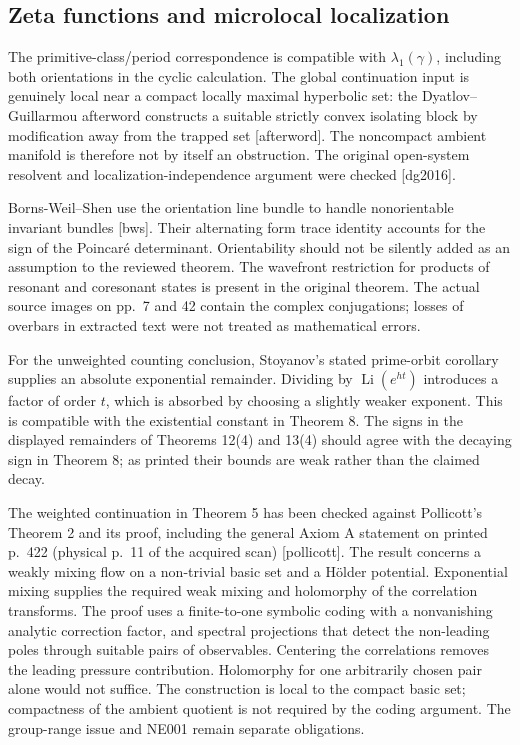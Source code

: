 \documentclass[10pt]{article}
\begin{document}
\subsection*{Zeta functions and microlocal localization}
The primitive-class/period correspondence is compatible with \(\lambda_1(\gamma)\), including both orientations in the cyclic calculation. The global continuation input is genuinely local near a compact locally maximal hyperbolic set: the Dyatlov–Guillarmou afterword constructs a suitable strictly convex isolating block by modification away from the trapped set [afterword]. The noncompact ambient manifold is therefore not by itself an obstruction. The original open-system resolvent and localization-independence argument were checked [dg2016].\par
Borns-Weil–Shen use the orientation line bundle to handle nonorientable invariant bundles [bws]. Their alternating form trace identity accounts for the sign of the Poincaré determinant. Orientability should not be silently added as an assumption to the reviewed theorem. The wavefront restriction for products of resonant and coresonant states is present in the original theorem. The actual source images on pp. 7 and 42 contain the complex conjugations; losses of overbars in extracted text were not treated as mathematical errors.\par
For the unweighted counting conclusion, Stoyanov’s stated prime-orbit corollary supplies an absolute exponential remainder. Dividing by \(\operatorname{Li}(e^{ht})\) introduces a factor of order \(t\), which is absorbed by choosing a slightly weaker exponent. This is compatible with the existential constant in Theorem 8. The signs in the displayed remainders of Theorems 12(4) and 13(4) should agree with the decaying sign in Theorem 8; as printed their bounds are weak rather than the claimed decay.\par
The weighted continuation in Theorem 5 has been checked against Pollicott’s Theorem 2 and its proof, including the general Axiom A statement on printed p. 422 (physical p. 11 of the acquired scan) [pollicott]. The result concerns a weakly mixing flow on a non-trivial basic set and a Hölder potential. Exponential mixing supplies the required weak mixing and holomorphy of the correlation transforms. The proof uses a finite-to-one symbolic coding with a nonvanishing analytic correction factor, and spectral projections that detect the non-leading poles through suitable pairs of observables. Centering the correlations removes the leading pressure contribution. Holomorphy for one arbitrarily chosen pair alone would not suffice. The construction is local to the compact basic set; compactness of the ambient quotient is not required by the coding argument. The group-range issue and NE001 remain separate obligations.\par
\end{document}
